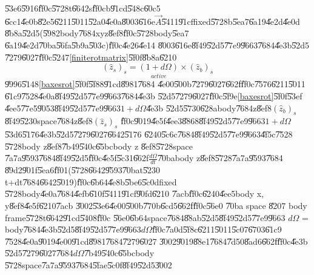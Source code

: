 \documentclass[12pt]{article}
\begin{document}
\U{53e6}\U{5916}\U{ff0c}\U{5728}t\U{6642}s\U{ff0c}b\U{91cd}\U{548c}\U{60c5}%
\U{6cc1}\U{4e0b}\U{82e5}\U{6211}\U{5011}\U{52a0}\U{4e0a}\U{8003}\U{616e}$%
\vec{A}$\U{5411}\U{91cf}fixed\U{5728}b\U{5ea7}\U{6a19}\U{4e2d}\U{4e0d}%
\U{8b8a}\U{52d5}(\U{5982}body\U{7684}xyz\U{8ef8}\U{ff0c}\U{5728}body\U{5ea7}%
\U{6a19}\U{4e2d}\U{70ba}\U{56fa}\U{5b9a}\U{503c})\U{ff0c}\U{4e26}\U{4e14}%
\U{8003}\U{616e}\U{8f49}\U{52d5}\U{77e9}\U{9663}\U{7684}\U{4e3b}\U{52d5}%
\U{7279}\U{6027}\U{ff0c}\U{5247}\ref{finiterotmatrix}\U{5f0f}\U{8b8a}\U{6210}%
\begin{equation}
\left( \hat{z}_{s}\right) _{s}=\underset{active}{\left( 1+d\Omega \right) }%
\times \left( \hat{z}_{b}\right) _{s}  \label{baxesrot}
\end{equation}%
\U{9996}\U{5148}\ref{baxesrot}\U{5f0f}\U{5f88}\U{91cd}\U{8981}\U{7684}%
\U{4e00}\U{500b}\U{7279}\U{6027}\U{662f}\U{ff0c}\U{7576}\U{6211}\U{5011}%
\U{61c9}\U{7528}\U{4e0a}\U{8f49}\U{52d5}\U{77e9}\U{9663}\U{7684}\U{4e3b}%
\U{52d5}\U{7279}\U{6027}\U{ff0c}\U{5f9e}\ref{baxesrot}\U{5f0f}\U{53ef}%
\U{4ee5}\U{77e5}\U{9053}\U{8f49}\U{52d5}\U{77e9}\U{9663}$1+d\Omega $\U{4e3b}%
\U{52d5}\U{5730}\U{628a}body\U{7684}z\U{8ef8}$\left( \hat{z}_{b}\right) _{s}$%
\U{8f49}\U{5230}space\U{7684}z\U{8ef8}$\left( \hat{z}_{s}\right) _{s}$%
\U{ff0c}\U{9019}\U{4e5f}\U{4ee3}\U{8868}\U{8f49}\U{52d5}\U{77e9}\U{9663}$%
1+d\Omega $\U{53d6}\U{5176}\U{4e3b}\U{52d5}\U{7279}\U{6027}\U{6642}\U{5176}%
\U{6240}\U{5c6c}\U{7684}\U{8f49}\U{52d5}\U{77e9}\U{9663}\U{4f5c}\U{7528}%
\U{5728}body z\U{8ef8}\U{7b49}\U{540c}\U{65bc}body z \U{8ef8}\U{5728}space%
\U{7a7a}\U{9593}\U{7684}\U{8f49}\U{52d5}\U{ff0c}\U{4e5f}\U{5c31}\U{662f}$%
\frac{d\Omega }{dt}$\U{70ba}body z\U{8ef8}\U{5728}\U{7a7a}\U{9593}\U{7684}%
\U{89d2}\U{901f}\U{5ea6}\U{ff01}(\U{5728}\U{6642}\U{9593}\U{70ba}t\U{5230}%
t+dt\U{7684}\U{6642}\U{5019})\U{ff0c}\U{6b64}\U{4e8b}\U{5be6}\U{5c0d}fixed%
\U{5728}body\U{4e0a}\U{7684}\U{4efb}\U{610f}\U{5411}\U{91cf}\U{90fd}\U{6210}%
\U{7acb}\U{ff0c}\U{6240}\U{4ee5}body x, y\U{8ef8}\U{4e5f}\U{6210}\U{7acb}%
\U{3002}\U{53e6}\U{4e00}\U{500b}\U{770b}\U{6cd5}\U{662f}\U{ff0c}\U{56e0}%
\U{70ba} space \U{8207} body frame\U{5728}t\U{6642}\U{91cd}\U{5408}\U{ff0c}%
\U{56e0}\U{6b64}space\U{7684}\U{88ab}\U{52d5}\U{8f49}\U{52d5}\U{77e9}\U{9663}%
$d\Omega $ = body\U{7684}\U{4e3b}\U{52d5}\U{8f49}\U{52d5}\U{77e9}\U{9663}$%
d\Omega $\U{ff0c}\U{7a0d}\U{5f8c}\U{6211}\U{5011}\U{5c07}\U{6703}\U{61c9}%
\U{7528}\U{4e0a}\U{9019}\U{4e00}\U{91cd}\U{8981}\U{7684}\U{7279}\U{6027}%
\U{3002}\U{9019}\U{88e1}\U{7684}\U{7d50}\U{8ad6}\U{662f}\U{ff0c}\U{4e3b}%
\U{52d5}\U{7279}\U{6027}\U{7684}$d\Omega $\U{7b49}\U{540c}\U{65bc}body%
\U{5728}space\U{7a7a}\U{9593}\U{7684}\U{5fae}\U{5c0f}\U{8f49}\U{52d5}\U{3002}
\end{document}
